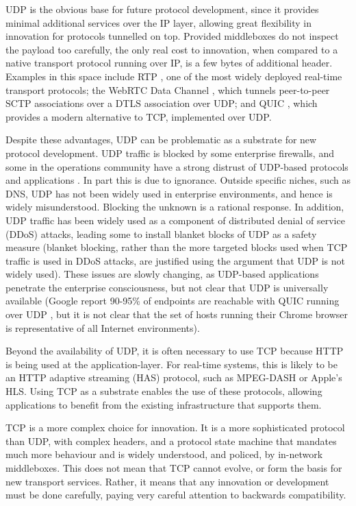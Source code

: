 \documentclass{sig-alternate-05-2015}
\begin{document}
UDP is the obvious base for future protocol development, since it provides
minimal additional services over the IP layer, allowing great flexibility
in innovation for protocols tunnelled on top. Provided middleboxes do not
inspect the payload too carefully, the only real cost to innovation, when
compared to a native transport protocol running over IP, is a few bytes of
additional header. Examples in this space include RTP \cite{rfc:3550}, one
of the most widely deployed real-time transport protocols; the WebRTC Data
Channel \cite{draft-ietf-rtcweb-data-channel-13}, which tunnels
peer-to-peer SCTP associations over a DTLS association over UDP; and QUIC
\cite{draft-tsvwg-quic-protocol-02}, which provides a modern alternative
to TCP, implemented over UDP.

Despite these advantages, UDP can be problematic as a substrate for new
protocol development. UDP traffic is blocked by some enterprise firewalls,
and some in the operations community have a strong distrust of UDP-based
protocols and applications \cite{draft-byrne-opsec-udp-advisory-00}. In
part this is due to ignorance. Outside specific niches, such as DNS, UDP
has not been widely used in enterprise environments, and hence is widely
misunderstood. Blocking the unknown is a rational response. In addition,
UDP traffic has been widely used as a component of distributed denial of
service (DDoS) attacks, leading some to install blanket blocks of UDP as
a safety measure (blanket blocking, rather than the more targeted blocks
used when TCP traffic is used in DDoS attacks, are justified using the
argument that UDP is not widely used).
These issues are slowly changing, as UDP-based applications penetrate the
enterprise consciousness, but not clear that UDP is universally available
(Google report 90-95\% of endpoints are reachable with QUIC
running over UDP \cite{roskind2013quic}, but it is not clear that the set
of hosts running their Chrome browser is representative of all Internet
environments).

Beyond the availability of UDP, it is often necessary to use TCP because
HTTP is being used at the application-layer. For real-time systems, this
is likely to be an HTTP adaptive streaming (HAS) protocol, such as
MPEG-DASH or Apple's HLS. Using TCP as a substrate enables the use of these
protocols, allowing applications to benefit from the existing
infrastructure that supports them.

TCP is a more complex choice for innovation. It is a more sophisticated
protocol than UDP, with complex headers, and a protocol state machine
that mandates much more behaviour and is widely understood, and policed,
by in-network middleboxes. This does not mean that TCP cannot evolve, or
form the basis for new transport services. Rather, it means that any
innovation or development must be done carefully, paying very careful
attention to backwards compatibility.
\end{document}
